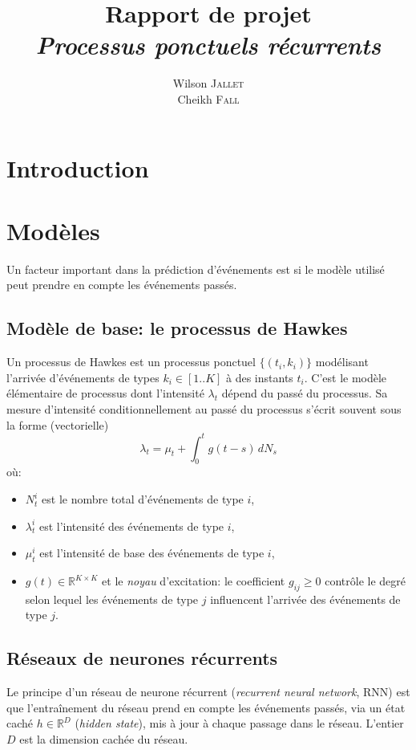 \documentclass[11pt]{article}
\title{\textbf{Rapport de projet}\\
  \textit{Processus ponctuels récurrents}
}
\author{
  Wilson \textsc{Jallet}\\
  Cheikh \textsc{Fall}
}
\newcommand{\RR}{\mathbb{R}}
\begin{document}
\maketitle

\section{Introduction}


\section{Modèles}

Un facteur important dans la prédiction d'événements est si le modèle utilisé peut prendre en compte les événements passés.

\subsection{Modèle de base: le processus de Hawkes}

Un processus de Hawkes est un processus ponctuel $\{(t_i, k_i)\}$ modélisant l'arrivée d'événements de types $k_i\in[1..K]$ à des instants $t_i$. C'est le modèle élémentaire de processus dont l'intensité $\lambda_t$ dépend du passé du processus. Sa mesure d'intensité conditionnellement au passé du processus s'écrit souvent sous la forme (vectorielle)
\begin{equation}
	\lambda_t = \mu_t + \int_0^t g(t-s)\,dN_s
\end{equation}
où:\begin{itemize}
	\item $N^i_t$ est le nombre total d'événements de type $i$,
	\item $\lambda_t^i$ est l'intensité des événements de type $i$,
	\item $\mu^i_t$ est l'intensité de base des événements de type $i$,
	\item $g(t) \in \RR^{K\times K}$ et le \textit{noyau} d'excitation: le coefficient $g_{ij} \geq 0$ contrôle le degré selon lequel les événements de type $j$ influencent l'arrivée des événements de type $j$.
\end{itemize} 

\subsection{Réseaux de neurones récurrents}

Le principe d'un réseau de neurone récurrent (\textit{recurrent neural network}, RNN) est que l'entraînement du réseau prend en compte les événements passés, via un état caché $h\in\RR^D$ (\textit{hidden state}), mis à jour à chaque passage dans le réseau. L'entier $D$ est la dimension cachée du réseau.
\end{document}
